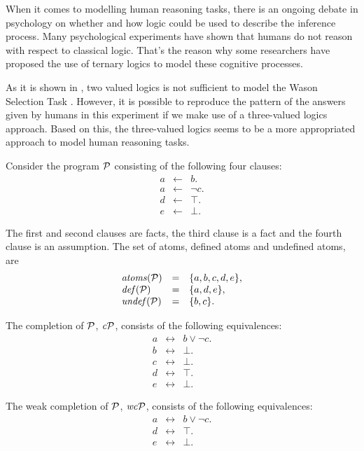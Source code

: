 When it comes to modelling human reasoning tasks, there is an ongoing debate in psychology on whether and how logic could be used to describe the inference process. Many psychological experiments have shown that humans do not reason with respect to classical logic. That's the reason why some researchers have proposed the use of ternary logics to model these cognitive processes. 

As it is shown in \cite{ragni2016two}, two valued logics is not sufficient to model the Wason Selection Task \cite{wason1968reasoning}. However, it is possible to reproduce the pattern of the answers given by humans in this experiment if we make use of a three-valued logics approach. Based on this, the three-valued logics seems to be a more appropriated approach to model human reasoning tasks.

\newpage
\vspace*{\fill}
\begin{tcolorbox}
\begin{example}
\label{example:program}
\normalfont 
Consider the program $\mathcal{P}$ consisting of the following four clauses:
\[
\begin{array}{lcl}
a & \leftarrow & b. \\
a & \leftarrow & \neg c. \\
d & \leftarrow & \top. \\
e & \leftarrow & \bot.
\end{array}
\]

The first and second clauses are facts, the third clause is a fact and the fourth clause is an assumption. The set of atoms, defined atoms and undefined atoms, are
\[
\begin{array}{lcl}
\mathit{atoms}(\mathcal{P}) &=& \{a, b, c, d, e\}, \\
\mathit{def}(\mathcal{P}) &=& \{a, d, e\}, \\
\mathit{undef}(\mathcal{P}) &=& \{b, c\}.
\end{array}
\]

The completion of $\mathcal{P}$, $\mathit{c}\mathcal{P}$, consists of the following equivalences:
\[
\begin{array}{lcl}
a & \leftrightarrow & b \vee \neg c. \\
b & \leftrightarrow & \bot. \\
c & \leftrightarrow & \bot. \\
d & \leftrightarrow & \top. \\
e & \leftrightarrow & \bot.
\end{array}
\]

The weak completion of $\mathcal{P}$, $\mathit{wc}\mathcal{P}$, consists of the following equivalences:
\[
\begin{array}{lcl}
a & \leftrightarrow & b \vee \neg c. \\
d & \leftrightarrow & \top. \\
e & \leftrightarrow & \bot.
\end{array}
\]
\end{example}
\end{tcolorbox}
\vspace*{\fill}
\newpage


